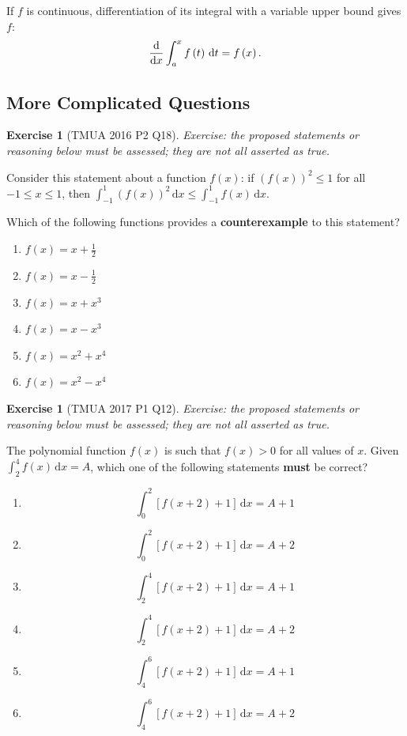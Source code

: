 \documentclass[11pt]{article}
\theoremstyle{definition}
\newtheorem{example}[theorem]{Exercise}
\theoremstyle{remark}
\newcommand{\pqty}[1]{\left(#1\right)}
\newcommand{\bqty}[1]{\left[#1\right]}
\newcommand{\dd}[1]{\,\mathrm{d}#1}
\begin{document}
If \(f\) is continuous, differentiation of its integral with a variable upper bound gives \(f\):
\[
    \dv{x} \int_{a}^{x} f\pqty{t} \dd{t} = f\pqty{x}.
\]

\subsection{More Complicated Questions}\label{tmua-4-subsection-013}

\begin{example}[TMUA 2016 P2 Q18]\label{tmua-4-unit-031}
\textit{Exercise: the proposed statements or reasoning below must be assessed; they are not all asserted as true.}\par

    Consider this statement about a function \(f\pqty{x}\): if \(\pqty{f\pqty{x}}^2 \leq 1\) for all \(-1 \leq x \leq 1\), then \(\int_{-1}^{1} \pqty{f\pqty{x}}^2 \dd{x} \leq \int_{-1}^{1} f\pqty{x} \dd{x}\).

    Which of the following functions provides a \textbf{counterexample} to this statement?
    
    \begin{enumerate}[label=\Alph*.]
        \item \(f\pqty{x} = x + \frac{1}{2}\)
        \item \(f\pqty{x} = x - \frac{1}{2}\)
        \item \(f\pqty{x} = x + x^3\)
        \item \(f\pqty{x} = x - x^3\)
        \item \(f\pqty{x} = x^2 + x^4\)
        \item \(f\pqty{x} = x^2 - x^4\)
    \end{enumerate}
\end{example}

\begin{example}[TMUA 2017 P1 Q12]\label{tmua-4-unit-032}
\textit{Exercise: the proposed statements or reasoning below must be assessed; they are not all asserted as true.}\par

    The polynomial function \(f\pqty{x}\) is such that \(f\pqty{x} > 0\) for all values of \(x\). Given \(\int_2^4 f\pqty{x} \dd{x} = A\), which one of the following statements \textbf{must} be correct?
    \begin{enumerate}[label=\Alph*.]
        \item \[\int_{0}^{2} \bqty{f\pqty{x + 2} + 1} \dd{x} = A + 1\]
        \item \[\int_{0}^{2} \bqty{f\pqty{x + 2} + 1} \dd{x} = A + 2\]
        \item \[\int_{2}^{4} \bqty{f\pqty{x + 2} + 1} \dd{x} = A + 1\]
        \item \[\int_{2}^{4} \bqty{f\pqty{x + 2} + 1} \dd{x} = A + 2\]
        \item \[\int_{4}^{6} \bqty{f\pqty{x + 2} + 1} \dd{x} = A + 1\]
        \item \[\int_{4}^{6} \bqty{f\pqty{x + 2} + 1} \dd{x} = A + 2\]
    \end{enumerate}
\end{example}
\end{document}
